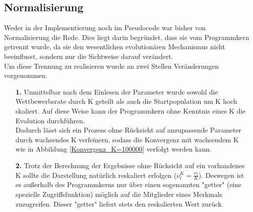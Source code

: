 \documentclass[11pt, a4paper, german]{article}
\theoremstyle{plain}
\begin{document}
	\subsection{Normalisierung}
	Weder in der Implementierung noch im Pseudocode war bisher von Normalisierung die Rede. Dies liegt darin begründet, dass sie vom Programmkern getrennt wurde, da sie den wesentlichen evolutionären Mechanismus nicht beeinflusst, sondern nur die Sichtweise darauf verändert.\\
	Um diese Trennung zu realisieren wurde an zwei Stellen Veränderungen vorgenommen.
	\begin{itemize}
		\item [\textbf{1.}] Unmittelbar nach dem Einlesen der Parameter wurde sowohl die Wettbewerbsrate durch K geteilt als auch die Startpopulation um K hoch skaliert. Auf diese Weise kann der Programmkern ohne Kenntnis eines K die Evolution durchführen.\\ 
		Dadurch lässt sich ein Prozess ohne Rücksicht auf anzupassende Parameter durch wachsendes K verfeinern, sodass die Konvergenz mit wachsendem K wie in Abbildung \ref{Konvergenz_K=100000} verfolgt werden kann.
		\item [\textbf{2.}] Trotz der Berechnung der Ergebnisse ohne Rücksicht auf ein vorhandenes K sollte die Darstellung natürlich reskaliert erfolgen ($ \nu_t^K = \frac{\nu_t}{K} $). Deswegen ist es außerhalb des Programmkerns nur über einen sogenannten "{}getter"{} (eine spezielle Zugriffsfunktion) möglich auf die Mitglieder eines Merkmals zuzugreifen. Dieser "{}getter"{} liefert stets den reskalierten Wert zurück.\\
	\end{itemize}
	
\end{document}
